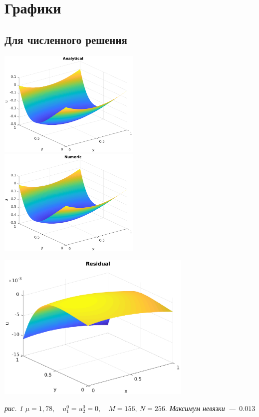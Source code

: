 \documentclass[12pt, a4paper]{article} %
\begin{document}
\newpage

\section{Графики}

\subsection{Для численного решения}

\noindent
\includegraphics[width=0.51\textwidth]{1_a.eps}
\includegraphics[width=0.51\textwidth]{1_n.eps}
\begin{center}
\includegraphics[width=0.7\textwidth]{1_r.eps}

\it{рис. 1 \quad $\mu = 1{,}78, \quad u_1^0 = u_2^0 = 0, \quad M = 156,\ N = 256.$ Максимум невязки~---~$0.013$}
\end{center}
\end{document}
